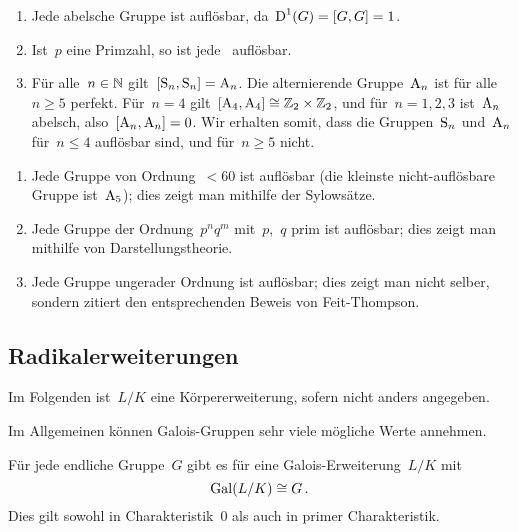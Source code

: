 \begin{example}
  \leavevmode
  \begin{enumerate}
    \item
      Jede abelsche Gruppe ist auflösbar, da~$\operatorname{D}^1(G) = [G,G] = 1$.
    \item
      Ist~$p$ eine Primzahl, so ist jede~ auflösbar.
    \item
      Für alle~$n \in \mathbb{N}$ gilt~$[\operatorname{S}_n, \operatorname{S}_n] = \operatorname{A}_n$.
      Die alternierende Gruppe~$\operatorname{A}_n$ ist für alle~$n \geq 5$ perfekt.
      Für~$n = 4$ gilt~$[\operatorname{A}_4, \operatorname{A}_4] \cong \mathbb{Z}_2 \times \mathbb{Z}_2$, und für~$n = 1, 2, 3$ ist~$\operatorname{A}_n$ abelsch, also~$[\operatorname{A}_n, \operatorname{A}_n] = 0$.
      Wir erhalten somit, dass die Gruppen~$\operatorname{S}_n$ und~$\operatorname{A}_n$ für~$n \leq 4$ auflösbar sind, und für~$n \geq 5$ nicht.
  \end{enumerate}
\end{example}

\begin{remark}
  \leavevmode
  \begin{enumerate}
    \item
      Jede Gruppe von Ordnung~$< 60$ ist auflösbar (die kleinste nicht-auflösbare Gruppe ist~$\operatorname{A}_5$);
      dies zeigt man mithilfe der Sylowsätze.
    \item
      Jede Gruppe der Ordnung~$p^n q^m$ mit~$p$,~$q$ prim ist auflösbar;
      dies zeigt man mithilfe von Darstellungstheorie.
    \item
      Jede Gruppe ungerader Ordnung ist auflösbar;
      dies zeigt man nicht selber, sondern zitiert den entsprechenden Beweis von Feit-Thompson.
  \end{enumerate}
\end{remark}



\subsection{Radikalerweiterungen}

\begin{convention}
  Im Folgenden ist~$L/K$ eine Körpererweiterung, sofern nicht anders angegeben.
\end{convention}

Im Allgemeinen können Galois-Gruppen sehr viele mögliche Werte annehmen.

\begin{theorem}
  Für jede endliche Gruppe~$G$ gibt es für eine Galois-Erweiterung~$L/K$ mit
  \[
    \operatorname{Gal}(L/K) \cong G \,.
  \]
  Dies gilt sowohl in Charakteristik~$0$ als auch in primer Charakteristik.
\end{theorem}

